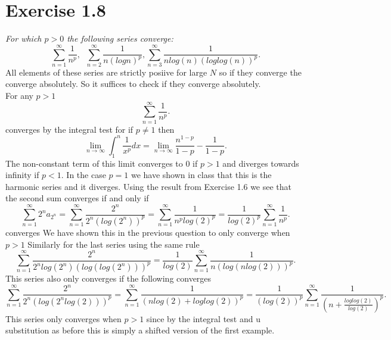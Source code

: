 \documentclass{amsart}
\begin{document}
    \section{Exercise 1.8}
    \emph{
        For which $p > 0$ the following series converge:
        \[
        \sum_{n=1}^{\infty}\frac{1}{n^{p}},  \;\; \sum_{n=2}^{\infty}\frac{1}{n(logn)^{p}}, \sum_{n=3}^{\infty}\frac{1}{nlog(n)(loglog(n))^{p}}
        .\] 
    }
    All elements of these series are strictly posiive for large $N$ so if they converge the converge absolutely. So it suffices to check if they converge absolutely.\\
    For any $p > 1$
    \[
    \sum_{n=1}^{\infty}\frac{1}{n^{p}}
    .\]
    converges by the integral test for if $p \ne 1$ then
    \[
    \lim_{n\to \infty}\int_{1}^{n}\frac{1}{x^{p}}dx = \lim_{n\to \infty}\frac{n^{1-p}}{1-p} - \frac{1}{1-p}
    .\] 
    The non-constant term of this limit converges to 0 if $p > 1$ and diverges towards infinity if  $p < 1$. In the case $p = 1$ 
    we have shown in class that this is the harmonic series and it diverges.
    Using the result from Exercise 1.6 we see that the second sum converges if and only if
    \[
        \sum_{n=1}^{\infty}2^{n}a_{2^{n}} = \sum_{n=1}^{\infty}\frac{2^{n}}{2^{n}(log(2^{n}))^{p}} = \sum_{n=1}^{\infty} \frac{1}{n^{p}log(2)^{p}} = \frac{1}{log(2)^{p}} \sum_{n=1}^{\infty} \frac{1}{n^{p}}
    .\] 
    converges We have shown this in the previous question to only converge when $p > 1$
    Similarly for the last series using the same rule
    \[
    \sum_{n=1}^{\infty}\frac{2^{n}}{2^{n}log(2^{n})(log(log(2^{n})))^{p}} = \frac{1}{log(2)}\sum_{n=1}^{\infty} \frac{1}{n(log(nlog(2)))^{p}}
    .\] 
    This series also only converges if the following converges
    \[
    \sum_{n=1}^{\infty} \frac{2^{n}}{2^{n}(log(2^{n}log(2)))^{p}} = \sum_{n=1}^{\infty}\frac{1}{(nlog(2) + loglog(2))^{p}} = \frac{1}{(log(2))^{p}}\sum_{n=1}^{\infty}\frac{1}{(n+\frac{loglog(2)}{log(2)})^{p}}
    .\] 
    This series only converges when $p > 1$ since by the integral test and u substitution as before this is simply a shifted version of the first example.
\end{document}
